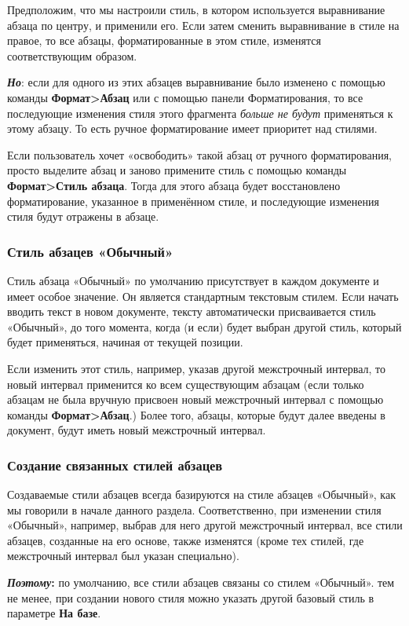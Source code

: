 ﻿\documentclass[a4paper,10pt]{article}
\begin{document}
Предположим, что мы настроили стиль, в котором используется выравнивание абзаца по центру, и применили его. Если затем сменить выравнивание в стиле на правое, то все абзацы, форматированные в этом стиле, изменятся соответствующим образом.

\textbf{\textit{Но}}: если для одного из этих абзацев выравнивание было изменено с помощью команды \textbf{Формат>Абзац} или с помощью панели Форматирования, то все последующие изменения стиля этого фрагмента \textit{больше не будут} применяться к этому абзацу. То есть ручное форматирование имеет приоритет над стилями.

Если пользователь хочет «освободить» такой абзац от ручного форматирования, просто выделите абзац и заново примените стиль с помощью команды \textbf{Формат>Стиль абзаца}. Тогда для этого абзаца будет восстановлено форматирование, указанное в применённом стиле, и последующие изменения стиля будут отражены в абзаце.

\subsubsection{Стиль абзацев «Обычный»}
Стиль абзаца «Обычный» по умолчанию присутствует в каждом документе и имеет особое значение. Он является стандартным текстовым стилем. Если начать вводить текст в новом документе, тексту автоматически присваивается стиль «Обычный», до того момента, когда (и если) будет выбран другой стиль, который будет применяться, начиная от текущей позиции.

Если изменить этот стиль, например, указав другой межстрочный интервал, то новый интервал применится ко всем существующим абзацам (если только абзацам не была вручную присвоен новый межстрочный интервал с помощью команды \textbf{Формат>Абзац}.) Более того, абзацы, которые будут далее введены в документ, будут иметь новый межстрочный интервал.

\subsubsection{Создание связанных стилей абзацев}
Создаваемые стили абзацев всегда базируются на стиле абзацев «Обычный», как мы говорили в начале данного раздела. Соответственно, при изменении стиля «Обычный», например, выбрав для него другой межстрочный интервал, все стили абзацев, созданные на его основе, также изменятся (кроме тех стилей, где межстрочный интервал был указан специально).

\begin{mdframed}[backgroundcolor=blue!10]
\textbf{\textit{Поэтому}:} по умолчанию, все стили абзацев связаны со стилем «Обычный». тем не менее, при создании нового стиля можно указать другой базовый стиль в параметре \textbf{На базе}.
\end{mdframed}
\end{document}
